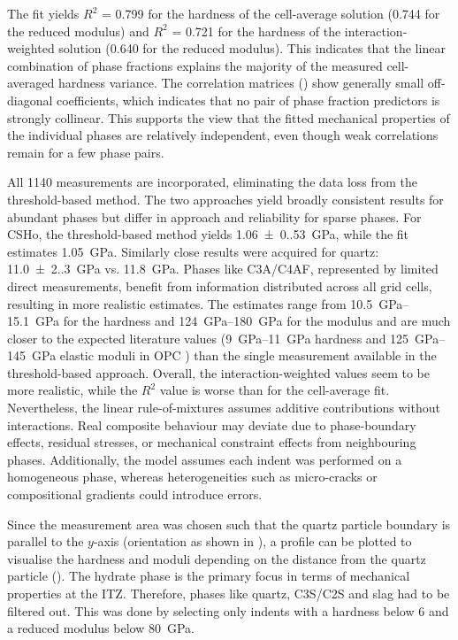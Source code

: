 The fit yields $R^2$ = \num{0.799} for the hardness of the cell-average solution (\num{0.744} for the reduced modulus) and $R^2$ = \num{0.721} for the hardness of the interaction-weighted solution (\num{0.640} for the reduced modulus).
This indicates that the linear combination of phase fractions explains the majority of the measured cell-averaged hardness variance.
The correlation matrices () show generally small off-diagonal coefficients, which indicates that no pair of phase fraction predictors is strongly collinear.
This supports the view that the fitted mechanical properties of the individual phases are relatively independent, even though weak correlations remain for a few phase pairs.

All \num{1140} measurements are incorporated, eliminating the data loss from the threshold-based method.
The two approaches yield broadly consistent results for abundant phases but differ in approach and reliability for sparse phases.
For \ac{CSHo}, the threshold-based method yields \qty{1.06(0.53)}{\giga\pascal}, while the fit estimates \qty{1.05}{\giga\pascal}.
Similarly close results were acquired for quartz: \qty{11.0(2.3)}{\giga\pascal} vs. \qty{11.8}{\giga\pascal}.
Phases like \acs{C3A}/\acs{C4AF}, represented by limited direct measurements, benefit from information distributed across all grid cells, resulting in more realistic estimates.
The estimates range from \qtyrange{10.5}{15.1}{\giga\pascal} for the hardness and \qtyrange{124}{180}{\giga\pascal} for the modulus and are much closer to the expected literature values (\qtyrange{9}{11}{\giga\pascal} hardness and \qtyrange{125}{145}{\giga\pascal} elastic moduli in \ac{OPC} \cite{velez.2001}) than the single measurement available in the threshold-based approach.
Overall, the interaction-weighted values seem to be more realistic, while the $R^2$ value is worse than for the cell-average fit.
Nevertheless, the linear rule-of-mixtures assumes additive contributions without interactions.
Real composite behaviour may deviate due to phase-boundary effects, residual stresses, or mechanical constraint effects from neighbouring phases.
Additionally, the model assumes each indent was performed on a homogeneous phase, whereas heterogeneities such as micro-cracks or compositional gradients could introduce errors.


Since the measurement area was chosen such that the quartz particle boundary is parallel to the $y$-axis (orientation as shown in ), a profile can be plotted to visualise the hardness and moduli depending on the distance from the quartz particle ().
The hydrate phase is the primary focus in terms of mechanical properties at the \ac{ITZ}.
Therefore, phases like quartz, \ac{C3S}/\ac{C2S} and slag had to be filtered out.
This was done by selecting only indents with a hardness below \num{6} and a reduced modulus below \qty{80}{\giga\pascal}.

